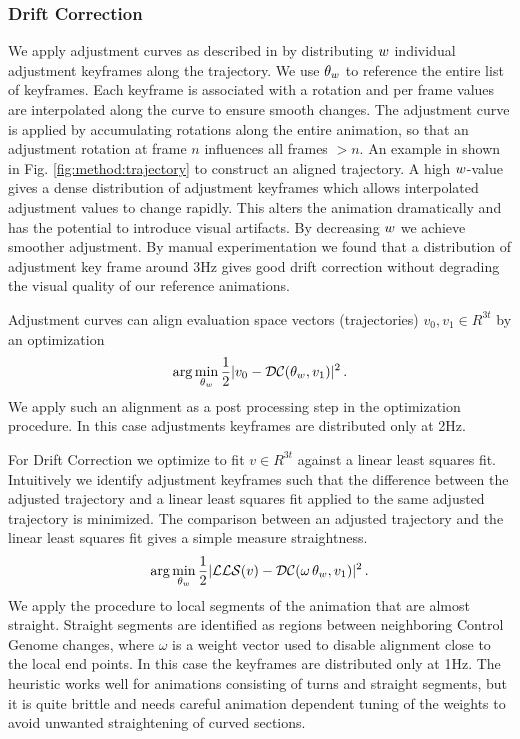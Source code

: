 \subsubsection{\bf Drift Correction} 
We apply adjustment curves as described in \citep{lowe16} by distributing ${w}$ individual adjustment keyframes along the trajectory. We use $\theta_{w}$ to reference the entire list of keyframes. Each keyframe is associated with a rotation and per frame values are interpolated along the curve to ensure smooth changes. The adjustment curve is applied by accumulating rotations along the entire animation, so that an adjustment rotation at frame $n$ influences all frames $>n$. An example in shown in Fig. \ref{fig:method:trajectory} to construct an aligned trajectory. A high ${w}$-value gives a dense distribution of adjustment keyframes which allows interpolated adjustment values to change rapidly. This alters the animation dramatically and has the potential to introduce visual artifacts. By decreasing ${w}$ we achieve smoother adjustment. By manual experimentation we found that a distribution of adjustment key frame around 3Hz gives good drift correction without degrading the visual quality of our reference animations.

Adjustment curves can align evaluation space vectors (trajectories) $v_0,v_1\in R^{3t}$ by an optimization
\begin{align}
    \arg\min_{\theta_{w}}{
        \frac{1}{2}|v_0-\mathcal{DC}(\theta_{w},v_1)|^2
    }
    \,.
\end{align}
We apply such an alignment as a post processing step in the optimization procedure. In this case adjustments keyframes are distributed only at 2Hz. 

For Drift Correction we optimize to fit $v \in R^{3t}$ against a linear least squares fit. Intuitively we identify adjustment keyframes such that the difference between the adjusted trajectory and a linear least squares fit applied to the same adjusted trajectory is minimized. The comparison between an adjusted trajectory and the linear least squares fit gives a simple measure straightness.
\begin{align}
    \arg\min_{\theta_{w}}{
        \frac{1}{2}|\mathcal{LLS}(v)-\mathcal{DC}(\omega\,\theta_{w},v_1)|^2
    }
    \,.
\end{align}
We apply the procedure to local segments of the animation that are almost straight. Straight segments are identified as regions between neighboring Control Genome changes, where $\omega$ is a weight vector used to disable alignment close to the local end points. In this case the keyframes are distributed only at 1Hz. The heuristic works well for animations consisting of turns and straight segments, but it is quite brittle and needs careful animation dependent tuning of the weights to avoid unwanted straightening of curved sections.


